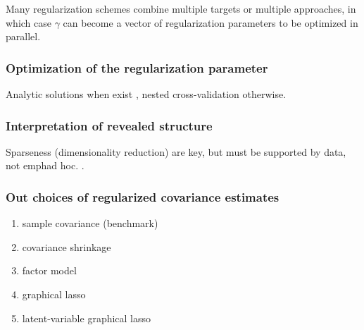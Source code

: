 Many regularization schemes combine multiple targets or multiple approaches, in which case $\gamma$ can become a vector of regularization parameters \citep{Schafer:2005,Fan:2011,Ma:2013} to be optimized in parallel.

\subsubsection{Optimization of the regularization parameter}
Analytic solutions when exist \citep{Ledoit:2004,Schafer:2005}, nested cross-validation otherwise.

\subsubsection{Interpretation of revealed structure}
Sparseness (dimensionality reduction) are key, but must be supported by data, not emph{ad hoc}. \citep{Fan:2006,Malmersjo:2013}.

\subsubsection{Out choices of regularized covariance estimates}
\begin{enumerate}[\qquad 1.\;\;]
\item sample covariance (benchmark)
\item covariance shrinkage 
\item factor model
\item graphical lasso
\item latent-variable graphical lasso
\end{enumerate}


